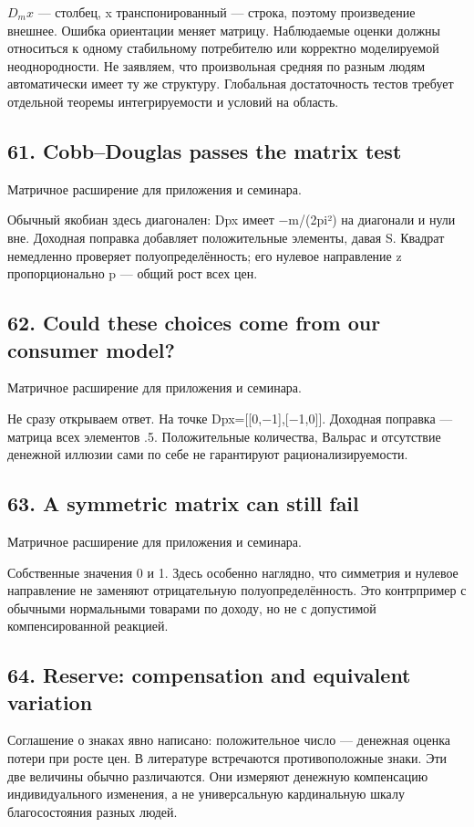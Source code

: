 \documentclass[11pt,a4paper]{article}
\begin{document}
$D_m x$ — столбец, x транспонированный — строка, поэтому произведение внешнее. Ошибка ориентации меняет матрицу. Наблюдаемые оценки должны относиться к одному стабильному потребителю или корректно моделируемой неоднородности. Не заявляем, что произвольная средняя по разным людям автоматически имеет ту же структуру. Глобальная достаточность тестов требует отдельной теоремы интегрируемости и условий на область.

\subsection*{61. Cobb--Douglas passes the matrix test}
Матричное расширение для приложения и семинара.

Обычный якобиан здесь диагонален: Dpx имеет −m/(2pi²) на диагонали и нули вне. Доходная поправка добавляет положительные элементы, давая S. Квадрат немедленно проверяет полуопределённость; его нулевое направление z пропорционально p — общий рост всех цен.

\subsection*{62. Could these choices come from our consumer model?}
Матричное расширение для приложения и семинара.

Не сразу открываем ответ. На точке Dpx=[[0,−1],[−1,0]]. Доходная поправка — матрица всех элементов .5. Положительные количества, Вальрас и отсутствие денежной иллюзии сами по себе не гарантируют рационализируемости.

\subsection*{63. A symmetric matrix can still fail}
Матричное расширение для приложения и семинара.

Собственные значения 0 и 1. Здесь особенно наглядно, что симметрия и нулевое направление не заменяют отрицательную полуопределённость. Это контрпример с обычными нормальными товарами по доходу, но не с допустимой компенсированной реакцией.

\subsection*{64. Reserve: compensation and equivalent variation}
Соглашение о знаках явно написано: положительное число — денежная оценка потери при росте цен. В литературе встречаются противоположные знаки. Эти две величины обычно различаются. Они измеряют денежную компенсацию индивидуального изменения, а не универсальную кардинальную шкалу благосостояния разных людей.
\end{document}
